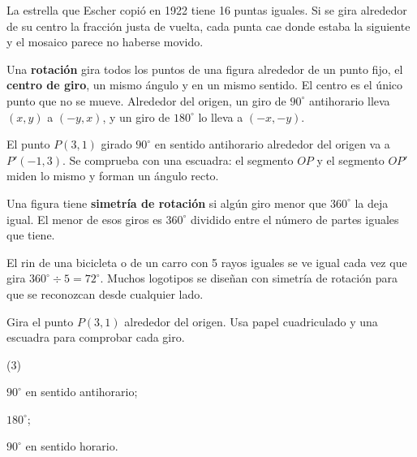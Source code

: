 \documentclass[11pt]{article}
\begin{document}
\begin{hilo}
La estrella que Escher copió en 1922 tiene 16 puntas iguales. Si se gira alrededor de su centro
la fracción justa de vuelta, cada punta cae donde estaba la siguiente y el mosaico parece no
haberse movido.
\end{hilo}

\begin{definicion}[Rotación]
Una \textbf{rotación} gira todos los puntos de una figura alrededor de un punto fijo, el
\textbf{centro de giro}, un mismo ángulo y en un mismo sentido. El centro es el único punto que
no se mueve. Alrededor del origen, un giro de $90^\circ$ antihorario lleva $(x, y)$ a
$(-y, x)$, y un giro de $180^\circ$ lo lleva a $(-x, -y)$.
\end{definicion}

\begin{ejemplo}
El punto $P(3, 1)$ girado $90^\circ$ en sentido antihorario alrededor del origen va a
$P'(-1, 3)$. Se comprueba con una escuadra: el segmento $OP$ y el segmento $OP'$ miden lo mismo
y forman un ángulo recto.

\begin{center}
\end{center}
\end{ejemplo}

Una figura tiene \textbf{simetría de rotación} si algún giro menor que $360^\circ$ la deja igual.
El menor de esos giros es $360^\circ$ dividido entre el número de partes iguales que tiene.

\begin{aplicacion}
El rin de una bicicleta o de un carro con 5 rayos iguales se ve igual cada vez que gira
$360^\circ \div 5 = 72^\circ$. Muchos logotipos se diseñan con simetría de rotación para que se
reconozcan desde cualquier lado.
\end{aplicacion}

\begin{preguntas}
\pregunta Gira el punto $P(3, 1)$ alrededor del origen. Usa papel cuadriculado y una escuadra
para comprobar cada giro.
\begin{opciones*}(3)
  \item $90^\circ$ en sentido antihorario;
  \item $180^\circ$;
  \item $90^\circ$ en sentido horario.
\end{opciones*}
\espacio{3.5cm}
\end{preguntas}
\end{document}

